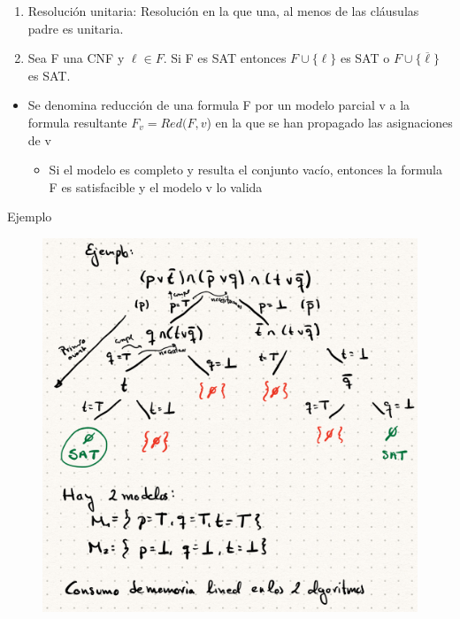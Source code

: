\documentclass[12pt, twoside, openright]{report} %
\begin{document}
  \begin{enumerate}
  \def\labelenumi{\arabic{enumi}.}

  \item
    Resolución unitaria: Resolución en la que una, al menos de las
    cláusulas padre es unitaria.
  \item
    Sea F una CNF y \(\ell \in F\). Si F es SAT entonces
    \(F \cup \{ \ell \}\) es SAT o \(F \cup \{ \overline{\ell} \}\) es
    SAT.
  \end{enumerate}

  \begin{itemize}
  \item
    Se denomina reducción de una formula F por un modelo parcial v a la
    formula resultante \(F_v = Red(F, v\)) en la que se han propagado
    las asignaciones de v

    \begin{itemize}
  
    \item
      Si el modelo es completo y resulta el conjunto vacío, entonces la
      formula F es satisfacible y el modelo v lo valida
    \end{itemize}
  \end{itemize}

  Ejemplo
  \begin{figure}[H]
	{\includegraphics[scale=.35]{Untitled 34.png}}
\end{figure}
\end{document}
